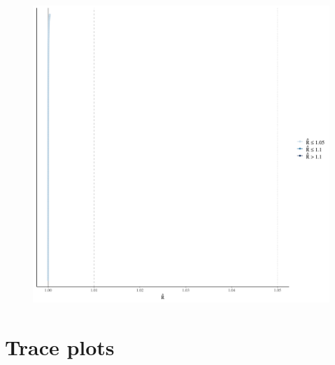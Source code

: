 \documentclass[
]{report}
\begin{document}
\begin{figure}

{\centering \includegraphics[width=1\textwidth,height=\textheight]{diagnostic_plots_files/figure-pdf/unnamed-chunk-16-1.pdf}

}

\end{figure}

\hypertarget{trace-plots-5}{%
\section{Trace plots}\label{trace-plots-5}}
\end{document}
